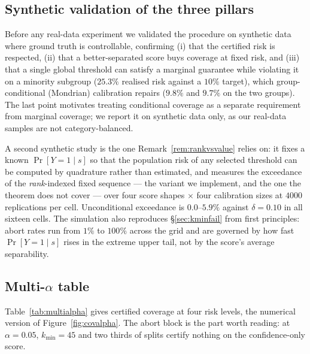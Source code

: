 \documentclass[review,number,doubleblind]{elsarticle}
\theoremstyle{plain}
\theoremstyle{definition}
\theoremstyle{remark}
\begin{document}
\subsection{Synthetic validation of the three pillars}
\label{app:synth}
Before any real-data experiment we validated the procedure on synthetic data where ground
truth is controllable, confirming (i) that the certified risk is respected, (ii) that a
better-separated score buys coverage at fixed risk, and (iii) that a single global
threshold can satisfy a marginal guarantee while violating it on a minority subgroup
($25.3\%$ realised risk against a $10\%$ target), which group-conditional (Mondrian)
calibration repairs ($9.8\%$ and $9.7\%$ on the two groups). The last point motivates
treating conditional coverage as a separate requirement from marginal coverage; we report it
on synthetic data only, as our real-data samples are not category-balanced.

A second synthetic study is the one Remark~\ref{rem:rankvsvalue} relies
on: it fixes a known $\Pr[Y=1\mid s]$ so that the population risk of any selected threshold can
be computed by quadrature rather than estimated, and measures the exceedance of the
\emph{rank}-indexed fixed sequence --- the variant we implement, and the one the theorem does not
cover --- over four score shapes $\times$ four calibration sizes at $4000$ replications per cell.
Unconditional exceedance is $0.0$--$5.9\%$ against $\delta=0.10$ in all sixteen cells. The
simulation also reproduces \S\ref{sec:kminfail} from first principles: abort rates run from $1\%$
to $100\%$ across the grid and are governed by how fast $\Pr[Y=1\mid s]$ rises in the extreme
upper tail, not by the score's average separability.

\subsection{Multi-$\alpha$ table}
Table~\ref{tab:multialpha} gives certified coverage at four risk levels, the numerical
version of Figure~\ref{fig:covalpha}. The abort block is the part worth reading: at
$\alpha=0.05$, $k_{\min}=45$ and two thirds of splits certify nothing on the confidence-only
score.
\end{document}
